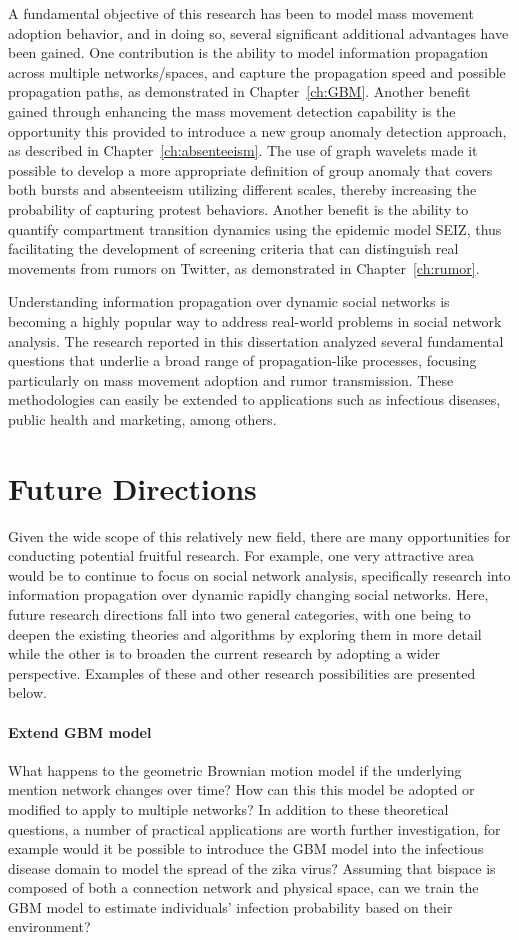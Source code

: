 A fundamental objective of this research has been to model mass movement adoption behavior, and in doing so, several significant additional advantages have been gained. One contribution is the ability to model information propagation across multiple networks/spaces, and capture the propagation speed and possible propagation paths, as demonstrated in Chapter~\ref{ch:GBM}. Another benefit gained through enhancing the mass movement detection capability is the opportunity this provided to introduce a new group anomaly detection approach, as described in Chapter~\ref{ch:absenteeism}. The use of graph wavelets made it possible to develop a more appropriate definition of group anomaly that covers both bursts and absenteeism utilizing different scales, thereby increasing the probability of capturing protest behaviors. Another benefit is the ability to quantify compartment transition dynamics using the epidemic model SEIZ, thus facilitating the development of screening criteria that can distinguish real movements from rumors on Twitter, as demonstrated in Chapter~\ref{ch:rumor}.

Understanding information propagation over dynamic social networks is becoming a highly popular way to address real-world problems in social network analysis. The research reported in this dissertation analyzed several fundamental questions that underlie a broad range of propagation-like processes, focusing particularly on mass movement adoption and rumor transmission. These methodologies can easily be extended to applications such as infectious diseases, public health and marketing, among others.

\section{Future Directions}
Given the wide scope of this relatively new field, there are many opportunities for conducting potential fruitful research. For example, one very attractive area would be to continue to focus on social network analysis, specifically research into information propagation over dynamic rapidly changing social networks. Here, future research directions fall into two general categories, with one being to deepen the existing theories and algorithms by exploring them in more detail while the other is to broaden the current research by adopting a wider perspective. Examples of these and other research possibilities are presented below.

\paragraph{Extend GBM model}
What happens to the geometric Brownian motion model if the underlying mention network changes over time? How can this this model be adopted or modified to apply to multiple networks? In addition to these theoretical questions, a number of practical applications are worth further investigation, for example would it be possible to introduce the GBM model into the infectious disease domain to model the spread of the zika virus? Assuming that bispace is composed of both a connection network and physical space, can we train the GBM model to estimate individuals' infection probability based on their environment?


